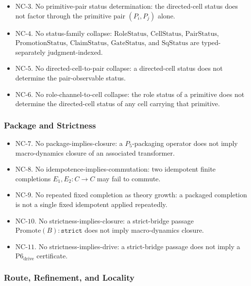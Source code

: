 \documentclass[11pt]{article}
\providecommand{\tightlist}{}
\theoremstyle{definition}
\begin{document}
\begin{itemize}
\tightlist
\item
  \(\mathrm{NC}\text{-}3\). No primitive-pair status determination: the directed-cell status does not factor through the primitive pair \((P_{i},P_{j})\) alone.
\item
  \(\mathrm{NC}\text{-}4\). No status-family collapse: \(\mathrm{RoleStatus}\), \(\mathrm{CellStatus}\), \(\mathrm{PairStatus}\), \(\mathrm{PromotionStatus}\), \(\mathrm{ClaimStatus}\), \(\mathrm{GateStatus}\), and \(\mathrm{SqStatus}\) are typed-separately judgment-indexed.
\item
  \(\mathrm{NC}\text{-}5\). No directed-cell-to-pair collapse: a directed-cell status does not determine the pair-observable status.
\item
  \(\mathrm{NC}\text{-}6\). No role-channel-to-cell collapse: the role status of a primitive does not determine the directed-cell status of any cell carrying that primitive.
\end{itemize}

\subsubsection{Package and Strictness}

\begin{itemize}
\tightlist
\item
  \(\mathrm{NC}\text{-}7\). No package-implies-closure: a \(P_{5}\)-packaging operator does not imply macro-dynamics closure of an associated transformer.
\item
  \(\mathrm{NC}\text{-}8\). No idempotence-implies-commutation: two idempotent finite completions \(E_{1},E_{2}:C\to C\) may fail to commute.
\item
  \(\mathrm{NC}\text{-}9\). No repeated fixed completion as theory growth: a packaged completion is not a single fixed idempotent applied repeatedly.
\item
  \(\mathrm{NC}\text{-}10\). No strictness-implies-closure: a strict-bridge passage \(\mathrm{Promote}(B):\texttt{strict}\) does not imply macro-dynamics closure.
\item
  \(\mathrm{NC}\text{-}11\). No strictness-implies-drive: a strict-bridge passage does not imply a \(\mathrm{P6}_{\mathrm{drive}}\) certificate.
\end{itemize}

\subsubsection{Route, Refinement, and Locality}
\end{document}

